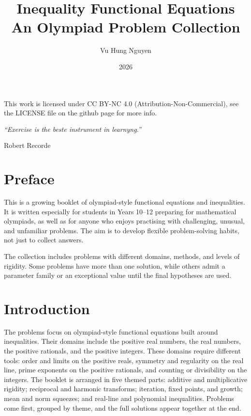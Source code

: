 \documentclass[12pt,a4paper]{article}
\title{\textbf{Inequality Functional Equations}\\
\large An Olympiad Problem Collection}
\author{Vu Hung Nguyen}
\date{2026}
\begin{document}


\newpage

\setcounter{page}{1}

\begingroup\small\noindent This work is licensed under CC BY-NC 4.0 (Attribution-Non-Commercial), see the LICENSE file on the github page for more info.\par\endgroup

\newpage
\thispagestyle{empty}
\vspace*{\fill}
\begin{center}
\itshape
``Exercise is the beste instrument in learnyng.''

\vspace{1em}
\normalfont Robert Recorde
\end{center}
\vspace*{\fill}

\newpage
\tableofcontents
\newpage

\section*{Preface}

This is a growing booklet of olympiad-style functional equations and
inequalities. It is written especially for students in Years 10--12 preparing
for mathematical olympiads, as well as for anyone who enjoys practising with
challenging, unusual, and unfamiliar problems. The aim is to develop flexible
problem-solving habits, not just to collect answers.

The collection includes problems with different domains, methods, and levels
of rigidity. Some problems have more than one solution, while others admit a
parameter family or an exceptional value until the final hypotheses are used.

\section*{Introduction}

The problems focus on olympiad-style functional equations built around
inequalities. Their domains include the positive real numbers, the real
numbers, the positive rationals, and the positive integers. These domains
require different tools: order and limits on the positive reals, symmetry and
regularity on the real line, prime exponents on the positive rationals, and
counting or divisibility on the integers. The booklet is arranged in five
themed parts: additive and multiplicative rigidity; reciprocal and harmonic
transforms; iteration, fixed points, and growth; mean and norm squeezes; and
real-line and polynomial inequalities. Problems come first, grouped by theme,
and the full solutions appear together at the end.
\end{document}
